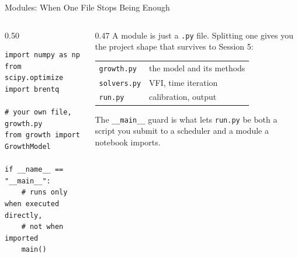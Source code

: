 \begin{frame}[fragile]{Modules: When One File Stops Being Enough}
\begin{columns}[T]
\begin{column}{0.50\textwidth}
\begin{lstlisting}
import numpy as np
from scipy.optimize import brentq

# your own file, growth.py
from growth import GrowthModel

if __name__ == "__main__":
    # runs only when executed directly,
    # not when imported
    main()
\end{lstlisting}
\end{column}
\begin{column}{0.47\textwidth}
\small
A module is just a \texttt{.py} file. Splitting one gives you the project shape that survives to Session 5:
\medskip
\begin{center}\footnotesize
\begin{tabular}{@{}ll@{}}
\toprule
\texttt{growth.py} & the model and its methods \\
\texttt{solvers.py} & VFI, time iteration \\
\texttt{run.py} & calibration, output \\
\bottomrule
\end{tabular}
\end{center}
\medskip
\begin{examplebox}\footnotesize
The \texttt{\_\_main\_\_} guard is what lets \texttt{run.py} be both a script you submit to a scheduler and a module a notebook imports.
\end{examplebox}
\end{column}
\end{columns}
\vspace{1mm}
\end{frame}


